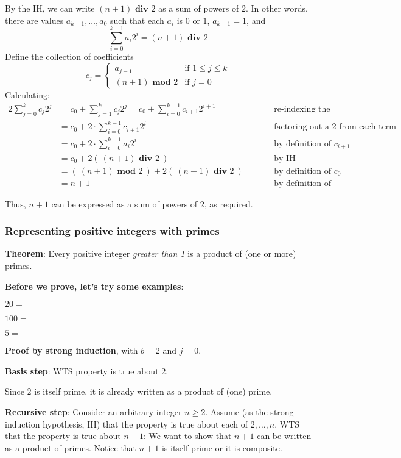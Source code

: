 \documentclass[12pt, oneside]{article}
\begin{document}
By the IH, we can write $(n+1) \textbf{ div } 2$ as 
a sum of powers of $2$. In other words, 
there are values $a_{k-1}, \ldots, a_0$ such that each $a_i$ is $0$ or $1$, $a_{k-1} = 1$, 
and
\[
    \sum_{i=0}^{k-1} a_i 2^i = (n+1) \textbf{ div } 2   
\]
Define the collection of coefficients
\[
   c_{j} = 
   \begin{cases}
        a_{j-1} \qquad&\text{if $1 \leq j \leq k$}\\
        (n+1) \textbf{ mod } 2 &\text{if $j = 0$}
   \end{cases}
\]
Calculating: 
\begin{alignat*}{2}
    \sum_{j=0}^k c_j 2^j &= c_0 + \sum_{j=1}^k c_j 2^j 
    = c_0 + \sum_{i=0}^{k-1} c_{i+1} 2^{i+1} &\qquad &\text{re-indexing the summation}\\
    &= c_0 + 2 \cdot \sum_{i=0}^{k-1} c_{i+1}2^i &\qquad &\text{factoring out a $2$ from each term in the sum}\\
    &= c_0 + 2 \cdot \sum_{i=0}^{k-1} a_{i} 2^i &\qquad &\text{by definition of $c_{i+1}$}\\
    &= c_0 + 2 \left(~(n+1) \textbf{ div } 2 ~\right) &\qquad &\text{by IH} \\
    &= \left(~ (n+1) \textbf{ mod } 2 ~\right ) + 2 \left(~(n+1) \textbf{ div } 2 ~\right) &\qquad &\text{by definition of $c_0$} \\
    &= n+1 &\qquad&\text{by definition of long division}
\end{alignat*}

Thus, $n+1$ can be expressed as a sum of powers of $2$, as required. 
\subsubsection*{Representing positive integers with primes}


{\bf Theorem}: Every positive integer {\it greater than 1} is a product of (one or more) primes.

{\bf Before we prove, let's try some examples}:

$20 = $

$100 = $

$5 = $


{\bf Proof by strong induction}, with $b=2$ and $j=0$.

{\bf Basis step}:  WTS property is true about  $2$.

Since $2$ is itself prime,
it is already written as a product of (one) prime.


{\bf Recursive step}: Consider an arbitrary integer $n \geq 2$.
Assume (as the strong induction hypothesis, IH) that the property is true about  each of $2, \ldots, n$.  
WTS that the property is true about  $n+1$: We want to show that $n+1$ can be written 
as a product of primes.  Notice that $n+1$ is itself prime or it is composite.
\end{document}
